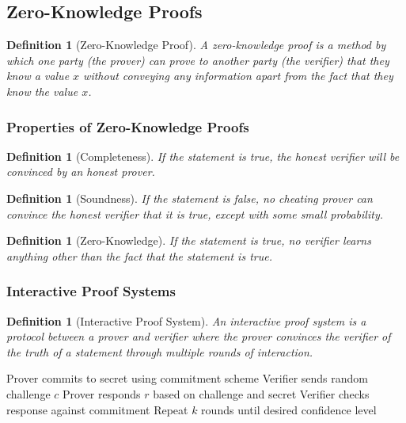 \documentclass[11pt,a4paper]{article}
\newtheorem{definition}[theorem]{Definition}
\begin{document}
\subsection{Zero-Knowledge Proofs}

\begin{definition}[Zero-Knowledge Proof]
A zero-knowledge proof is a method by which one party (the prover) can prove to another party (the verifier) that they know a value $x$ without conveying any information apart from the fact that they know the value $x$.
\end{definition}

\subsubsection{Properties of Zero-Knowledge Proofs}

\begin{definition}[Completeness]
If the statement is true, the honest verifier will be convinced by an honest prover.
\end{definition}

\begin{definition}[Soundness]
If the statement is false, no cheating prover can convince the honest verifier that it is true, except with some small probability.
\end{definition}

\begin{definition}[Zero-Knowledge]
If the statement is true, no verifier learns anything other than the fact that the statement is true.
\end{definition}

\subsubsection{Interactive Proof Systems}

\begin{definition}[Interactive Proof System]
An interactive proof system is a protocol between a prover and verifier where the prover convinces the verifier of the truth of a statement through multiple rounds of interaction.
\end{definition}

\begin{algorithm}
\caption{Interactive Zero-Knowledge Proof Protocol}
\begin{algorithmic}[1]
\STATE Prover commits to secret using commitment scheme
\STATE Verifier sends random challenge $c$
\STATE Prover responds $r$ based on challenge and secret
\STATE Verifier checks response against commitment
\STATE Repeat $k$ rounds until desired confidence level
\end{algorithmic}
\end{algorithm}
\end{document}
